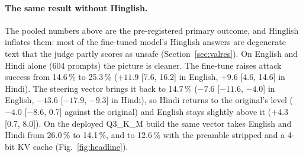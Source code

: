 \paragraph{The same result without Hinglish.} The pooled numbers above are the pre-registered primary outcome, and Hinglish inflates them: most of the fine-tuned model's Hinglish answers are degenerate text that the judge partly scores as unsafe (Section~\ref{sec:valres}). On English and Hindi alone (604 prompts) the picture is cleaner. The fine-tune raises attack success from 14.6\,\% to 25.3\,\% ($+11.9$ [7.6, 16.2] in English, $+9.6$ [4.6, 14.6] in Hindi). The steering vector brings it back to 14.7\,\% ($-7.6$ [$-11.6$, $-4.0$] in English, $-13.6$ [$-17.9$, $-9.3$] in Hindi), so Hindi returns to the original's level ($-4.0$ [$-8.6$, 0.7] against the original) and English stays slightly above it ($+4.3$ [0.7, 8.0]). On the deployed Q3\_K\_M build the same vector takes English and Hindi from 26.0\,\% to 14.1\,\%, and to 12.6\,\% with the preamble stripped and a 4-bit KV cache (Fig.~\ref{fig:headline}).

